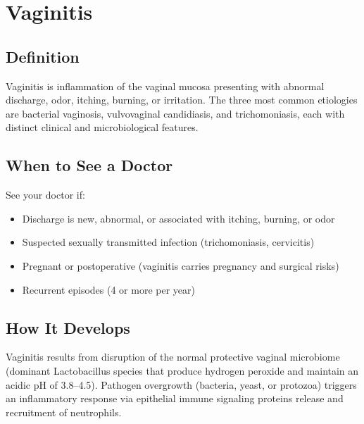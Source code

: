 \chapter{Vaginitis}

\section*{Definition}
Vaginitis is inflammation of the vaginal mucosa presenting with abnormal discharge, odor, itching, burning, or irritation. The three most common etiologies are bacterial vaginosis, vulvovaginal candidiasis, and trichomoniasis, each with distinct clinical and microbiological features.

\section*{When to See a Doctor}
See your doctor if:
\begin{itemize}
  \item Discharge is new, abnormal, or associated with itching, burning, or odor
  \item Suspected sexually transmitted infection (trichomoniasis, cervicitis)
  \item Pregnant or postoperative (vaginitis carries pregnancy and surgical risks)
  \item Recurrent episodes (4 or more per year)
\end{itemize}

\section*{How It Develops}
Vaginitis results from disruption of the normal protective vaginal microbiome (dominant Lactobacillus species that produce hydrogen peroxide and maintain an acidic pH of 3.8--4.5). Pathogen overgrowth (bacteria, yeast, or protozoa) triggers an inflammatory response via epithelial immune signaling proteins release and recruitment of neutrophils.

